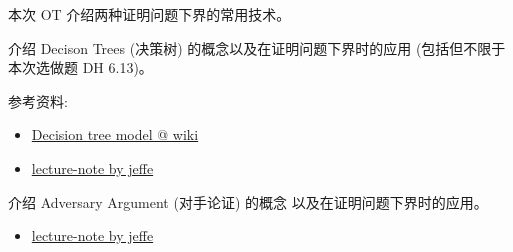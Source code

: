 \documentclass[a4paper, justified]{tufte-handout}
\begin{document}
\beginoptional

\begin{problem}[DH Problem 6.13]
\end{problem}

\begin{solution}
\end{solution}

\beginot

本次 OT 介绍两种证明问题下界的常用技术。

\begin{ot}
  介绍 Decison Trees (决策树) 的概念以及在证明问题下界时的应用
  (包括但不限于本次选做题 DH 6.13)。

  参考资料:
  \begin{itemize}
    \item \href{https://en.wikipedia.org/wiki/Decision\_tree\_model}{Decision tree model @ wiki}
    \item \href{http://jeffe.cs.illinois.edu/teaching/algorithms/notes/12-lowerbounds.pdf}{lecture-note by jeffe}
  \end{itemize}
\end{ot}

\vspace{0.50cm}
\begin{ot}
  介绍 Adversary Argument (对手论证) 的概念
  以及在证明问题下界时的应用。

  \begin{itemize}
    \item \href{http://jeffe.cs.illinois.edu/teaching/algorithms/notes/13-adversary.pdf}{lecture-note by jeffe}
  \end{itemize}
\end{ot}




\beginfb

\end{document}
